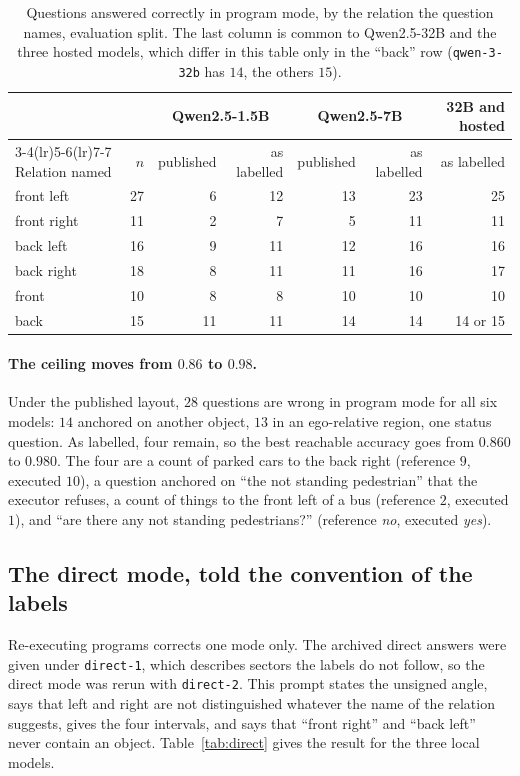 \documentclass[11pt,a4paper]{article}
\newcommand{\code}[1]{\texttt{\small #1}}
\begin{document}
\begin{table}[ht]
\centering
\small
\begin{tabular}{lrrrrrr}
\toprule
 & & \multicolumn{2}{c}{Qwen2.5-1.5B} & \multicolumn{2}{c}{Qwen2.5-7B} & 32B and hosted \\
\cmidrule(lr){3-4}\cmidrule(lr){5-6}\cmidrule(lr){7-7}
Relation named & $n$ & published & as labelled & published & as labelled & as labelled \\
\midrule
front left  & 27 & 6  & 12 & 13 & 23 & 25 \\
front right & 11 & 2  & 7  & 5  & 11 & 11 \\
back left   & 16 & 9  & 11 & 12 & 16 & 16 \\
back right  & 18 & 8  & 11 & 11 & 16 & 17 \\
front       & 10 & 8  & 8  & 10 & 10 & 10 \\
back        & 15 & 11 & 11 & 14 & 14 & 14 or 15 \\
\bottomrule
\end{tabular}
\caption{Questions answered correctly in program mode, by the relation the
question names, evaluation split. The last column is common to Qwen2.5-32B
and the three hosted models, which differ in this table only in the ``back''
row (\code{qwen-3-32b} has $14$, the others $15$).}
\label{tab:byrel}
\end{table}

\paragraph{The ceiling moves from $0.86$ to $0.98$.} Under the published
layout, $28$ questions are wrong in program mode for all six models: $14$
anchored on another object, $13$ in an ego-relative region, one status
question. As labelled, four remain, so the best reachable accuracy goes from
$0.860$ to $0.980$. The four are a count of parked cars to the back right
(reference $9$, executed $10$), a question anchored on ``the not standing
pedestrian'' that the executor refuses, a count of things to the front left
of a bus (reference $2$, executed $1$), and ``are there any not standing
pedestrians?'' (reference \emph{no}, executed \emph{yes}).

\subsection{The direct mode, told the convention of the labels}
\label{sec:direct2}

Re-executing programs corrects one mode only. The archived direct answers
were given under \code{direct-1}, which describes sectors the labels do not
follow, so the direct mode was rerun with \code{direct-2}. This prompt states
the unsigned angle, says that left and right are not distinguished whatever
the name of the relation suggests, gives the four intervals, and says that
``front right'' and ``back left'' never contain an object.
Table~\ref{tab:direct} gives the result for the three local models.
\end{document}
